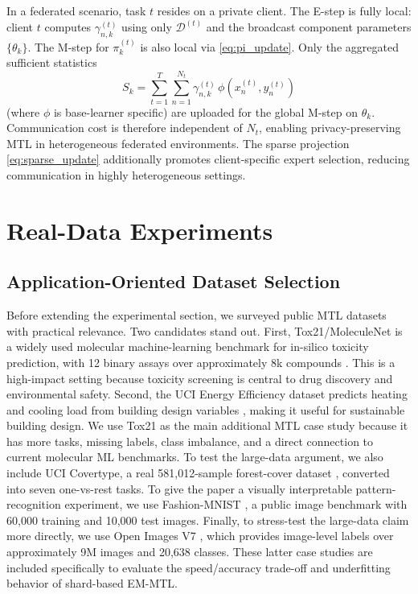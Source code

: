 \documentclass[preprint,12pt]{elsarticle}
\begin{document}
	In a federated scenario, task $t$ resides on a private client. The
	E-step is fully local: client $t$ computes $\gamma_{n,k}^{(t)}$
	using only $\mathcal{D}^{(t)}$ and the broadcast component
	parameters $\{\theta_k\}$. The M-step for $\pi_k^{(t)}$ is also
	local via \eqref{eq:pi_update}. Only the aggregated sufficient statistics
	\[
	S_k = \sum_{t=1}^T \sum_{n=1}^{N_t}
	\gamma_{n,k}^{(t)}\,\phi\!\left(x_n^{(t)}, y_n^{(t)}\right)
	\]
	(where $\phi$ is base-learner specific) are uploaded for the global
	M-step on $\theta_k$. Communication cost is therefore independent of
	$N_t$, enabling privacy-preserving MTL in heterogeneous federated
	environments. The sparse projection \eqref{eq:sparse_update}
	additionally promotes client-specific expert selection, reducing
	communication in highly heterogeneous settings.
	
	\section{Real-Data Experiments}
	\label{sec:experiments}
	
	\subsection{Application-Oriented Dataset Selection}
	
	Before extending the experimental section, we surveyed public MTL
	datasets with practical relevance. Two candidates stand out. First,
	Tox21/MoleculeNet is a widely used molecular machine-learning benchmark
	for in-silico toxicity prediction, with 12 binary assays over
	approximately 8k compounds \citep{wu2018moleculenet,tox21challenge}.
	This is a high-impact setting because toxicity screening is central to
	drug discovery and environmental safety. Second, the UCI Energy
	Efficiency dataset predicts heating and cooling load from building
	design variables \citep{tsanas2012energy}, making it useful for
	sustainable building design. We use Tox21 as the main additional MTL
	case study because it has more tasks, missing labels, class imbalance,
	and a direct connection to current molecular ML benchmarks. To test the
	large-data argument, we also include UCI Covertype, a real 581,012-sample
	forest-cover dataset \citep{blackard1998covertype}, converted into seven
	one-vs-rest tasks. To give the paper a visually interpretable
	pattern-recognition experiment, we use Fashion-MNIST
	\citep{xiao2017fashion}, a public image benchmark with 60,000 training
	and 10,000 test images. Finally, to stress-test the large-data claim
	more directly, we use Open Images V7 \citep{kuznetsova2020openimages},
	which provides image-level labels over approximately 9M images and
	20,638 classes. These latter case studies are included specifically to
	evaluate the speed/accuracy trade-off and underfitting behavior of
	shard-based EM-MTL.
	
\end{document}
